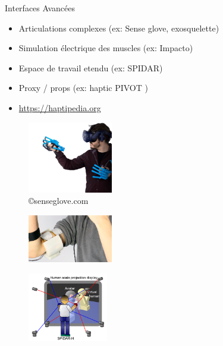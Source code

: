 \begin{frame}{Interfaces Avancées}
\begin{itemize}
\item Articulations complexes (ex: Sense glove, exosquelette)
\item Simulation électrique des muscles (ex: Impacto)
\item Espace de travail etendu (ex: SPIDAR)
\item Proxy / props (ex: haptic PIVOT \cite{kovacs2020haptic})
\item \url{https://haptipedia.org} \cite{seifi2019haptipedia}
\end{itemize}
\begin{multicols}{3}
\begin{figure}
\centering
\includegraphics[width=3.7cm]{images/senseglove}
\caption{\copyright senseglove.com}
\end{figure}
\begin{figure}
\centering
\includegraphics[width=3.7cm]{images/impacto}
\caption{\cite{lopes2015}}
\end{figure}
\begin{figure}
\centering
\includegraphics[width=3.5cm]{images/spidar}
\caption{\cite{Hasegawa2006a}}
\end{figure}
\end{multicols}
\end{frame}

